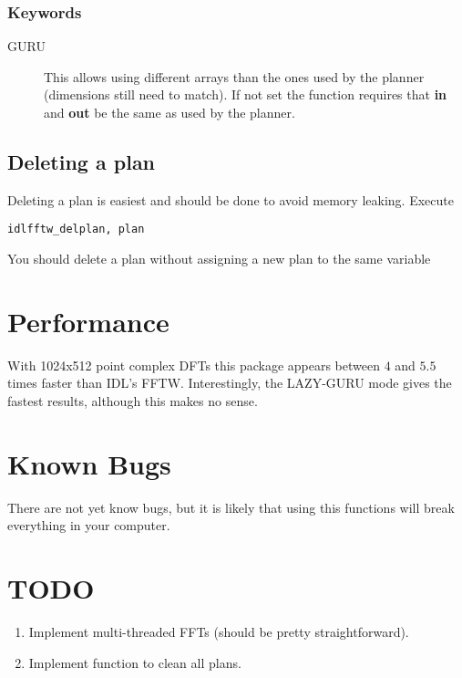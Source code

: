 \documentclass[a4paper,11pt]{article}
\begin{document}
\subsubsection*{Keywords}

\begin{description}
\item[GURU] This allows using different arrays than the ones used by the planner (dimensions still need to match). If not set the function requires that \textbf{in} and \textbf{out} be the same as used by the planner. 
\end{description}

\subsection{Deleting a plan}

Deleting a plan is easiest and should be done to avoid memory leaking. Execute
\begin{verbatim}
idlfftw_delplan, plan
\end{verbatim} 
You should delete a plan without assigning a new plan to the same variable

\section{Performance}

With 1024x512 point complex DFTs this package appears between $4$ and $5.5$ times faster than IDL's FFTW. Interestingly, the LAZY-GURU mode gives the fastest results, although this makes no sense.

\section{Known Bugs}

There are not yet know bugs, but it is likely that using this functions will break everything in your computer.

\section{TODO}

\begin{enumerate}
\item Implement multi-threaded FFTs (should be pretty straightforward).
\item Implement function to clean all plans.
\end{enumerate}
\end{document}

